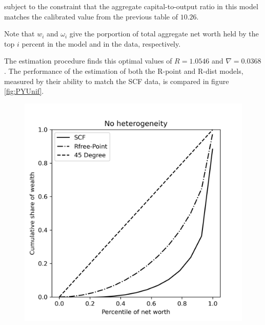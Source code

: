 \par subject to the constraint that the aggregate capital-to-output ratio in this model matches the calibrated value from the previous table of $10.26$.

\par Note that $w_i$ and $\omega_i$ give the porportion of total aggregate net worth held by the top $i$ percent in the model and in the data, respectively.

\par The estimation procedure finds this optimal values of $R = 1.0546$ and $\nabla = 0.0368$. The performance of the estimation of both the R-point and R-dist models, measured by their ability to match the SCF data, is compared in figure \ref{fig:PYUnif}.

\begin{figure}[h]
    \centering
    \begin{minipage}{0.48\textwidth}
        \centering
        \includegraphics[width=\textwidth]{../Figures/PYrrPointNetWorthPlot.png}
    \end{minipage}
    \hfill
    \begin{minipage}{0.48\textwidth}
        \centering

\end{minipage}
\end{figure}
